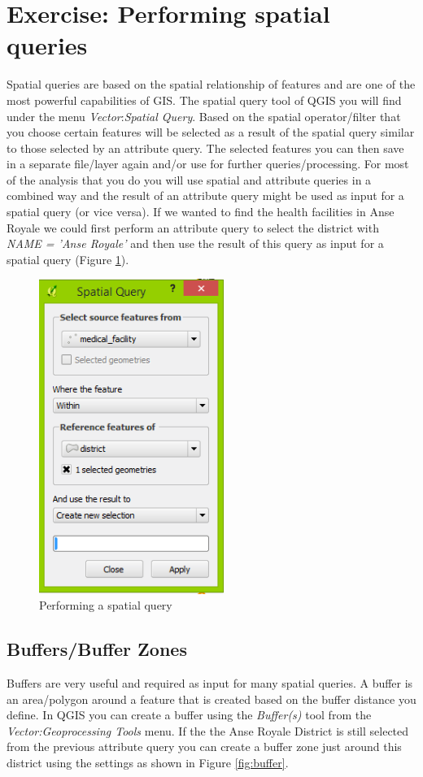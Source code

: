 \documentclass[a4paper,12pt,titlepage]{article}
\begin{document}
\section{Exercise: Performing spatial queries}
Spatial queries are based on the spatial relationship of features and are one of the most powerful capabilities of GIS. The spatial query tool of QGIS you will find under the menu \textit{Vector}:\textit{Spatial Query}. Based on the spatial operator/filter that you choose certain features will be selected as a result of the spatial query similar to those selected by an attribute query. The selected features you can then save in a separate file/layer again and/or use for further queries/processing.
For most of the analysis that you do you will use spatial and attribute queries in a combined way and the result of an attribute query might be used as input for a spatial query (or vice versa). If we wanted to find the health facilities in Anse Royale we could first perform an attribute query to select the district with \textit{NAME = 'Anse Royale'} and then use the result of this query as input for a spatial query (Figure \ref{fig:spatial_query1}).

\begin{figure}[h]
\centering
\includegraphics[width=6cm]{Images/spatial_query1.png}
\caption{Performing a spatial query}\label{fig:spatial_query1}
\end{figure}

\subsection{Buffers/Buffer Zones}
Buffers are very useful and required as input for many spatial queries. A buffer is an area/polygon around a feature that is created based on the buffer distance you define. In QGIS you can create a buffer using the \textit{Buffer(s)} tool from the \textit{Vector:Geoprocessing Tools} menu. If the the Anse Royale District is still selected from the previous attribute query you can create a buffer zone just around this district using the settings as shown in Figure \ref{fig:buffer}.
\end{document}

